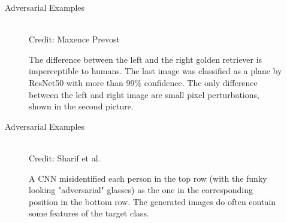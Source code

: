 \documentclass[11pt,compress,t,notes=noshow]{beamer}
\begin{document}
 \begin{frame} {Adversarial Examples}
  \begin{figure}
    \centering
       \captionsetup{font=footnotesize,labelfont=footnotesize, labelfont = bf}
      \tiny{\\Credit: Maxence Prevost}
      \caption{\footnotesize The difference between the left and the right golden retriever is imperceptible to humans.
      The last image was classified as a plane by ResNet50 with more than 99\% confidence. 
      The only difference between the left and right image are small pixel perturbations, shown in the second picture.}
  \end{figure}
\end{frame}

\begin{frame} {Adversarial Examples}
  \begin{figure}
    \centering
       \captionsetup{font=footnotesize,labelfont=footnotesize, labelfont = bf}
      \tiny{\\Credit: Sharif et al.}
      \caption{\footnotesize A CNN misidentified each person in the top row (with the funky looking "adversarial" glasses) as the one in the corresponding position in the bottom row. The generated images do often contain some features of the target class.}
  \end{figure}
\end{frame}
\end{document}
